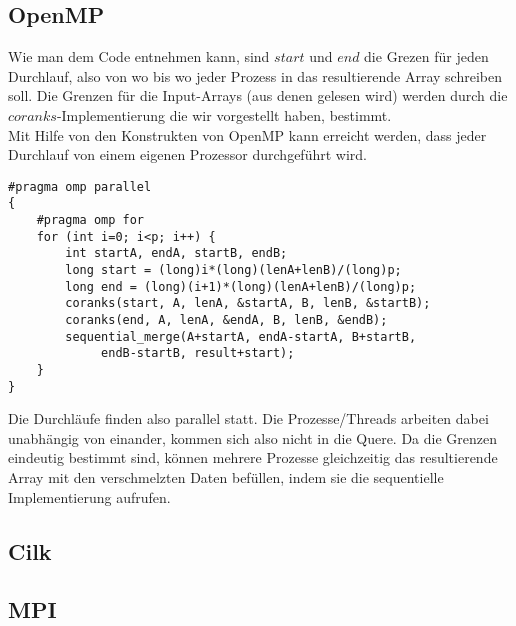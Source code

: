 \subsection{OpenMP}
Wie man dem Code entnehmen kann, sind $start$ und $end$ die Grezen für jeden Durchlauf, also von wo bis wo jeder Prozess in das resultierende Array schreiben soll. Die Grenzen für die Input-Arrays (aus denen gelesen wird) werden durch die $coranks$-Implementierung die wir vorgestellt haben, bestimmt.\\
Mit Hilfe von den Konstrukten von OpenMP kann erreicht werden, dass jeder Durchlauf von einem eigenen Prozessor durchgeführt wird. 
\begin{verbatim}
#pragma omp parallel
{
    #pragma omp for
    for (int i=0; i<p; i++) {
        int startA, endA, startB, endB;
        long start = (long)i*(long)(lenA+lenB)/(long)p;
        long end = (long)(i+1)*(long)(lenA+lenB)/(long)p;
        coranks(start, A, lenA, &startA, B, lenB, &startB);
        coranks(end, A, lenA, &endA, B, lenB, &endB);
        sequential_merge(A+startA, endA-startA, B+startB, 
             endB-startB, result+start);
    }
}
\end{verbatim}
Die Durchläufe finden also parallel statt. Die Prozesse/Threads arbeiten dabei unabhängig von einander, kommen sich also nicht in die Quere. Da die Grenzen eindeutig bestimmt sind, können mehrere Prozesse gleichzeitig das resultierende Array mit den verschmelzten Daten befüllen, indem sie die sequentielle Implementierung aufrufen.

\subsection{Cilk}

\subsection{MPI}